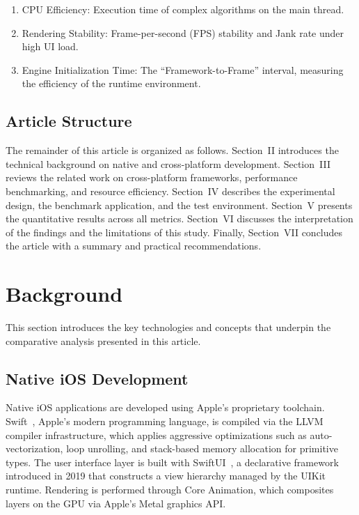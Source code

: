 \documentclass[journal]{IEEEtran}
\begin{document}
\begin{enumerate}
	\item CPU Efficiency: Execution time of complex algorithms on the main thread.
	\item Rendering Stability: Frame-per-second (FPS) stability and Jank rate under high UI load.
	\item Engine Initialization Time: The ``Framework-to-Frame'' interval, measuring the efficiency of the
	      runtime environment.
\end{enumerate}

\subsection{Article Structure}
The remainder of this article is organized as follows. Section~II introduces the technical background on native and cross-platform development. Section~III reviews the related work on cross-platform frameworks, performance benchmarking, and resource efficiency. Section~IV describes the experimental design, the benchmark application, and the test environment. Section~V presents the quantitative results across all metrics. Section~VI discusses the interpretation of the findings and the limitations of this study. Finally, Section~VII concludes the article with a summary and practical recommendations.

\section{Background}
This section introduces the key technologies and concepts that underpin the comparative analysis presented in this article.

\subsection{Native iOS Development}
Native iOS applications are developed using Apple's proprietary toolchain. Swift~\cite{apple2024swift}, Apple's modern programming language, is compiled via the LLVM compiler infrastructure, which applies aggressive optimizations such as auto-vectorization, loop unrolling, and stack-based memory allocation for primitive types. The user interface layer is built with SwiftUI~\cite{apple2024swiftui}, a declarative framework introduced in 2019 that constructs a view hierarchy managed by the UIKit runtime. Rendering is performed through Core Animation, which composites layers on the GPU via Apple's Metal graphics API.
\end{document}
